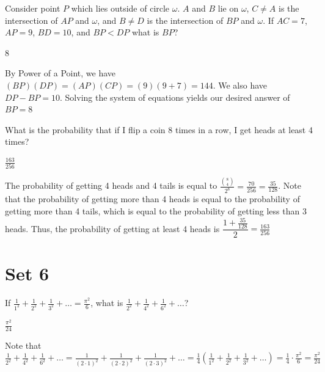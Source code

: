 \documentclass[11pt]{article}
\begin{document}
\begin{problem}
Consider point $P$ which lies outside of circle $\omega$. $A$ and $B$ lie on $\omega$, $C \neq A$ is the intersection of $AP$ and $\omega$, and $B\neq D$ is the intersection of $BP$ and $\omega$. If $AC=7$, $AP=9$, $BD=10$, and $BP < DP$ what is $BP$?
\end{problem}

\begin{answer}
8
\end{answer}

\begin{solution}
By Power of a Point, we have $(BP)(DP) = (AP)(CP) = (9)(9+7) = 144$. We also have $DP-BP = 10$. Solving the system of equations yields our desired answer of $BP=\boxed{8}$
\end{solution}

\begin{problem}
What is the probability that if I flip a coin 8 times in a row, I get heads at least 4 times?
\end{problem}

\begin{answer}
$\frac{163}{256}$
\end{answer}

\begin{solution}
The probability of getting 4 heads and 4 tails is equal to $\frac{\binom{8}{4}}{2^8} = \frac{70}{256} = \frac{35}{128}$. 
Note that the probability of getting more than 4 heads is equal to the probability of getting more than 4 tails, 
which is equal to the probability of getting less than 3 heads. Thus, the probability of getting at least 4 heads is 
$\dfrac{1+\frac{35}{128}}{2} = \boxed{\frac{163}{256}}$
\end{solution}

\newpage
\section*{Set 6}
\begin{problem}
If $\frac{1}{1^2} + \frac{1}{2^2} + \frac{1}{3^2} + \dots = \frac{\pi^2}{6}$, what is $\frac{1}{2^2} + \frac{1}{4^2} + \frac{1}{6^2} + \ldots$?
\end{problem}

\begin{answer}
$\frac{\pi^2}{24}$
\end{answer}

\begin{solution}
Note that $\frac{1}{2^2} + \frac{1}{4^2} + \frac{1}{6^2} + \ldots = \frac{1}{(2 \cdot 1)^2} + \frac{1}{(2 \cdot 2)^2} + \frac{1}{(2 \cdot 3)^2} + \dots = \frac{1}{4}\left(\frac{1}{1^2} + \frac{1}{2^2} + \frac{1}{3^2} + \dots\right) = \frac{1}{4} \cdot \frac{\pi^2}{6} = \boxed{\frac{\pi^2}{24}}$
\end{solution}
\end{document}
